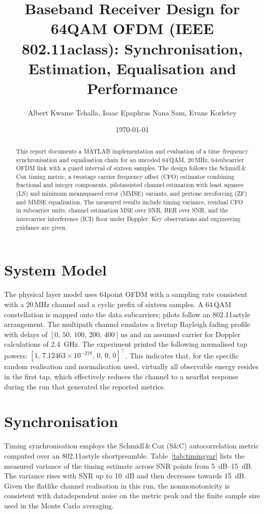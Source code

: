\documentclass[journal,onecolumn]{IEEEtran}
\title{Baseband Receiver Design for 64\textendash QAM OFDM (IEEE 802.11a\textendash class): Synchronisation, Estimation, Equalisation and Performance}
\author{Albert Kwame Tchalla, Isaac Epaphras Nana Sam, Evans Korletey}
\date{\today}
\begin{document}
\maketitle

\begin{abstract}
This report documents a MATLAB implementation and evaluation of a time--frequency synchronisation and equalisation chain for an uncoded 64\,QAM, 20\,MHz, 64\textendash subcarrier OFDM link with a guard interval of sixteen samples. The design follows the Schmidl\,\&\,Cox timing metric, a two\textendash stage carrier frequency offset (CFO) estimator combining fractional and integer components, pilot\textendash assisted channel estimation with least squares (LS) and minimum mean\textendash squared error (MMSE) variants, and per\textendash tone zero\textendash forcing (ZF) and MMSE equalisation. The measured results include timing variance, residual CFO in subcarrier units, channel estimation MSE over SNR, BER over SNR, and the inter\textendash carrier interference (ICI) floor under Doppler. Key observations and engineering guidance are given.
\end{abstract}

\section{System Model}
The physical layer model uses 64\textendash point OFDM with a sampling rate consistent with a 20\,MHz channel and a cyclic prefix of sixteen samples. A 64\,QAM constellation is mapped onto the data subcarriers; pilots follow an 802.11a\textendash style arrangement. The multipath channel emulates a five\textendash tap Rayleigh fading profile with delays of $[0,\,50,\,100,\,200,\,400]\,\mathrm{ns}$ and an assumed carrier for Doppler calculations of \SI{2.4}{GHz}. The experiment printed the following normalised tap powers: $[1,\,7.12463\times10^{-218},\,0,\,0,\,0]^\top$. This indicates that, for the specific random realisation and normalisation used, virtually all observable energy resides in the first tap, which effectively reduces the channel to a near\textendash flat response during the run that generated the reported metrics.

\section{Synchronisation}
Timing synchronisation employs the Schmidl\,\&\,Cox (S\&C) autocorrelation metric computed over an 802.11a\textendash style short\textendash preamble. Table~\ref{tab:timingvar} lists the measured variance of the timing estimate across SNR points from \SIrange{5}{15}{dB}. The variance rises with SNR up to \SI{10}{dB} and then decreases towards \SI{15}{dB}. Given the flat\textendash like channel realisation in this run, the non\textendash monotonicity is consistent with data\textendash dependent noise on the metric peak and the finite sample size used in the Monte Carlo averaging.
\end{document}
